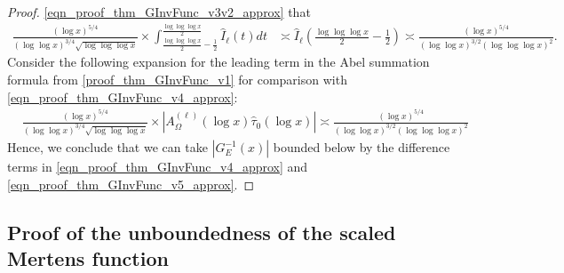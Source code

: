 \documentclass[11pt,reqno,a4letter]{article}
\numberwithin{figure}{section}
\numberwithin{table}{section}
\theoremstyle{plain}
\numberwithin{theorem}{section}
\theoremstyle{definition}
\begin{document}
\begin{proof}
\eqref{eqn_proof_thm_GInvFunc_v3v2_approx} that 
\begin{align} 
\label{eqn_proof_thm_GInvFunc_v4_approx} 
\frac{(\log x)^{5/4}}{(\log\log x)^{3/4} \sqrt{\log\log\log x}} \times 
     \int_{\frac{\log\log\log x}{2}-\frac{1}{2}}^{\frac{\log\log\log x}{2}} 
     \widehat{I}_{\ell}(t) dt & \asymp 
     \widehat{I}_{\ell}\left(\frac{\log\log\log x}{2}-\frac{1}{2}\right) 
     \asymp \frac{(\log x)^{5/4}}{(\log\log x)^{3/2}(\log\log\log x)^2}. 
\end{align} 
Consider the following expansion for the leading term in 
the Abel summation formula from \eqref{proof_thm_GInvFunc_v1} for comparison with 
\eqref{eqn_proof_thm_GInvFunc_v4_approx}: 
\begin{align} 
\label{eqn_proof_thm_GInvFunc_v5_approx} 
 & \frac{(\log x)^{5/4}}{(\log\log x)^{3/4} \sqrt{\log\log\log x}} \times 
     \left\lvert A_{\Omega}^{(\ell)}(\log x) \widehat{\tau}_0(\log x) \right\rvert 
     \asymp 
     \frac{(\log x)^{5/4}}{(\log\log x)^{3/2} (\log\log\log x)^2}
\end{align} 
Hence, we conclude that we can take $\left\lvert G_{E}^{-1}\left(x\right) \right\rvert$ 
bounded below by the difference terms in 
\eqref{eqn_proof_thm_GInvFunc_v4_approx} and 
\eqref{eqn_proof_thm_GInvFunc_v5_approx}. 
\end{proof} 

\subsection{Proof of the unboundedness of the scaled Mertens function}
\label{subSection_TheCoreResultProof} 
\end{document}
